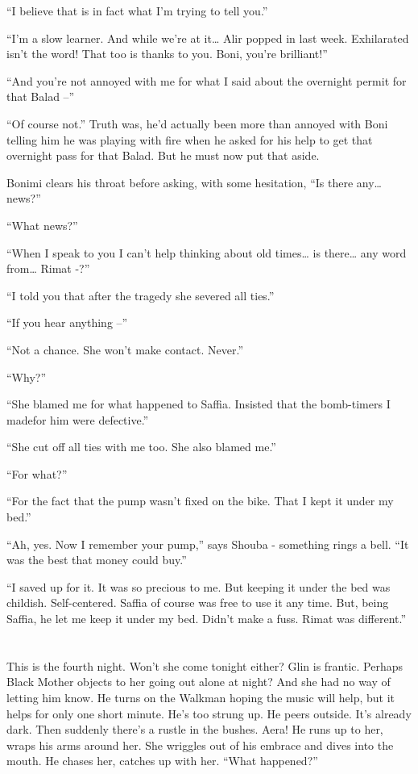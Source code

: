 \documentclass[twoside,11pt]{book}
\begin{document}
``I believe that is in fact what I'm trying to tell you.''

``I'm a slow learner. And while we're at it{\dots} Alir popped in last week. Exhilarated isn't the word!
That too is thanks to you. Boni, you're brilliant!''

``And you're not annoyed with me for what I said about the overnight permit for that Balad
--''

``Of course not.'' Truth was, he'd actually been more than annoyed with Boni
telling him he was playing with fire when he asked for his help to get that overnight pass for that
Balad. But he must now put that aside.

Bonimi clears his throat before asking, with some hesitation,
``Is there any{\dots} news?''

``What news?''

``When I speak to you I can't help thinking about old times{\dots} is there{\dots} any word from{\dots}
Rimat -?''

``I told you that after the tragedy she severed all ties.''

``If you hear anything --''

``Not a chance. She won't make contact. Never.''

``Why?''

``She blamed me for what happened to Saffia. Insisted that the bomb-timers I madefor him were
defective.''

``She cut off all ties with me too. She also blamed me.''

``For what?''

``For the fact that the pump wasn't fixed on the bike. That I kept it under my bed.''

``Ah, yes. Now I remember your pump,'' says Shouba - something rings a bell. ``It was the best that money
could buy.''

``I saved up for it. It was so precious to me. But keeping it under the bed was childish. Self-centered. Saffia of
course was free to use it any time. But, being Saffia, he let me keep it under my bed. Didn't make a fuss. Rimat was
different.''


\bigskip

\chapter{}

This is the fourth night. Won't she come tonight either? Glin is frantic. Perhaps Black Mother objects to her going out
alone at night? And she had no way of letting him know. He turns on the Walkman hoping the music will help, but it
helps for only one short minute. He's too strung up. He peers outside. It's already dark. Then suddenly there's a
rustle in the bushes. Aera! He runs up to her, wraps his arms around her. She wriggles out of his embrace and dives
into the mouth. He chases her, catches up with her. ``What happened?''
\end{document}
